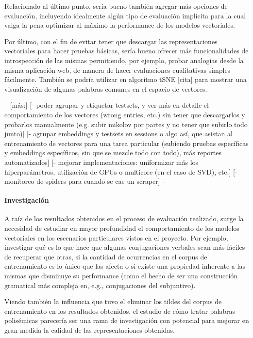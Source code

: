 Relacionado al último punto, sería bueno también agregar más opciones de evaluación, incluyendo
idealmente algún tipo de evaluación implícita para la cual valga la pena optimizar al máximo la
performance de los modelos vectoriales.

Por último, con el fin de evitar tener que descargar las representaciones vectoriales para hacer
pruebas básicas, sería bueno ofrecer más funcionalidades de introspección de las mismas permitiendo,
por ejemplo, probar analogías desde la misma aplicación web, de manera de hacer evaluaciones
cualitativas simples fácilmente. También se podría utilizar en algoritmo tSNE [cita] para mostrar
una visualización de algunas palabras comunes en el espacio de vectores.

--
[más:]
[- poder agrupar y etiquetar testsets, y ver más en detalle el comportamiento de los vectores
(wrong entries, etc.) sin tener que descargarlos y probarlos manualmente (e.g. subir mikolov por
partes y no tener que subirlo todo junto)]
[- agrupar embeddings y testsets en sessions o algo así, que asistan al entrenamiento de
vectores para una tarea particular (subiendo pruebas específicas y embeddings específicos, sin que
se mezcle todo con todo), más reportes automatizados]
[- mejorar implementaciones: uniformizar más los hiperparámetros, utilización de GPUs o
multicore (en el caso de SVD), etc.]
[- monitoreo de spiders para cuando se cae un scraper]
--


\paragraph{Investigación}

A raíz de los resultados obtenidos en el proceso de evaluación realizado, surge la necesidad de
estudiar en mayor profundidad el comportamiento de los modelos vectoriales en los escenarios
particulares vistos en el proyecto. Por ejemplo, investigar qué es lo que hace que algunas
conjugaciones verbales sean más fáciles de recuperar que otras, si la cantidad de ocurrencias en el
corpus de entrenamiento es lo único que las afecta o si existe una propiedad inherente a las mismas
que disminuye su performance (como el hecho de ser una construcción gramatical más compleja en,
e.g., conjugaciones del subjuntivo).

Viendo también la influencia que tuvo el eliminar los tildes del corpus de entrenamiento en los
resultados obtenidos, el estudio de cómo tratar palabras polisémicas parecería ser una rama de
investigación con potencial para mejorar en gran medida la calidad de las representaciones
obtenidas.


